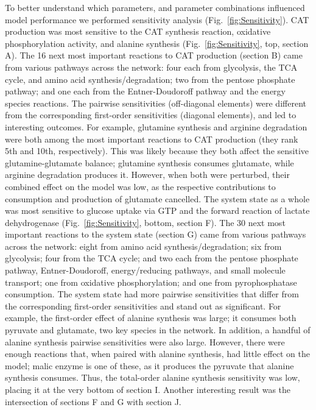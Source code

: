 \documentclass[12pt]{article}
\begin{document}
To better understand which parameters, and parameter combinations influenced model performance we performed sensitivity analysis (Fig.~\ref{fig:Sensitivity}).
CAT production was most sensitive to the CAT synthesis reaction, oxidative phosphorylation activity, and alanine synthesis (Fig.~\ref{fig:Sensitivity}, top, section A).
The 16 next most important reactions to CAT production (section B) came from various pathways across the network: four each from glycolysis, the TCA cycle, and amino acid synthesis/degradation; two from the pentose phosphate pathway; and one each from the Entner-Doudoroff pathway and the energy species reactions.
The pairwise sensitivities (off-diagonal elements) were different from the corresponding first-order sensitivities (diagonal elements), and led to interesting outcomes.
For example, glutamine synthesis and arginine degradation were both among the most important reactions to CAT production (they rank 5th and 10th, respectively).
This was likely because they both affect the sensitive glutamine-glutamate balance; glutamine synthesis consumes glutamate, while arginine degradation produces it.
However, when both were perturbed, their combined effect on the model was low, as the respective contributions to consumption and production of glutamate cancelled.
The system state as a whole was most sensitive to glucose uptake via GTP and the forward reaction of lactate dehydrogenase (Fig.~\ref{fig:Sensitivity}, bottom, section F).
The 30 next most important reactions to the system state (section G) came from various pathways across the network: eight from amino acid synthesis/degradation; six from glycolysis; four from the TCA cycle; and two each from the pentose phosphate pathway, Entner-Doudoroff, energy/reducing pathways, and small molecule transport; one from oxidative phosphorylation; and one from pyrophosphatase consumption. The system state had more pairwise sensitivities that differ from the corresponding first-order sensitivities and stand out as significant.
For example, the first-order effect of alanine synthesis was large; it consumes both pyruvate and glutamate, two key species in the network.
In addition, a handful of alanine synthesis pairwise sensitivities were also large.
However, there were enough reactions that, when paired with alanine synthesis, had little effect on the model; malic enzyme is one of these, as it produces the pyruvate that alanine synthesis consumes. Thus, the total-order alanine synthesis sensitivity was low, placing it at the very bottom of section I.
Another interesting result was the intersection of sections F and G with section J.
\end{document}
